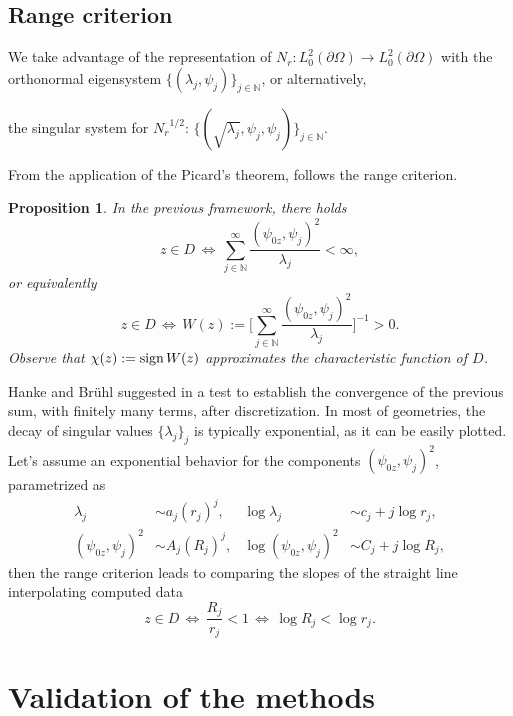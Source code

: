 \documentclass[10pt, a4paper, twoside, openright]{book}
\theoremstyle{definition}
\theoremstyle{plain}
\theoremstyle{plain}
\theoremstyle{plain}
\newtheorem{proposition}[subsection]{Proposition}
\theoremstyle{plain}
\theoremstyle{plain}
\theoremstyle{plain}
\theoremstyle{plain}
\theoremstyle{plain}
\begin{document}
\section{Range criterion}
\label{section:range-criterion}
We take advantage of the representation of ${N_r}:L^2_0(\partial \Omega)\to L^2_0(\partial \Omega)$ with the orthonormal eigensystem $\bigl\{(\lambda_j, \psi_j)\bigr\}_{j\in\mathbb{N}}$, or alternatively,
\begin{center}
the singular system for ${N_r}^{1/2}$: $\bigl\{(\sqrt{\lambda_j}, \psi_j, \psi_j)\bigr\}_{j\in\mathbb{N}}$.
\end{center}
From the application of the Picard's theorem, follows the range criterion.
\begin{proposition}
 In the previous framework, there holds
 \begin{equation}
  z \in D \, \Longleftrightarrow \, \sum_{j \in \mathbb{N}}^{\infty}\frac{(\psi_{0z}, \psi_j)^2}{\lambda_j} < \infty,
 \end{equation}
 or equivalently
 \begin{equation}
  z \in D \, \Longleftrightarrow \, W(z):=\Bigg[\sum_{j \in \mathbb{N}}^{\infty}\frac{(\psi_{0z}, \psi_j)^2}{\lambda_j}\Bigg]^{-1} > 0.
 \end{equation}
Observe that $\chi(z):=\textup{sign}\,W(z)$ approximates the characteristic function of $D$.
\end{proposition}
Hanke and Br\"{u}hl suggested in \cite{hanke-bruhl:recent} a test to establish the convergence of the previous sum, with finitely many terms, after discretization. In most of geometries, the decay of singular values $\bigl\{\lambda_j\bigr\}_j$ is typically exponential, as it can be easily plotted. 
Let's assume an exponential behavior for the components $(\psi_{0z},\psi_j )^2$, parametrized as
\begin{align}
 \lambda_j &\sim a_j (r_j) ^j,  & \log\lambda_j &\sim c_j + j\log r_j,\\
 (\psi_{0z}, \psi_j)^2 &\sim A_j(R_j)^j, & \log(\psi_{0z}, \psi_j)^2 &\sim C_j + j\log R_j,
\end{align}
then the range criterion leads to comparing the slopes of the straight line interpolating computed data
\begin{equation}
 z\in D \,\Longleftrightarrow\, \dfrac{R_j}{r_j} < 1 \,\Longleftrightarrow\, \log R_j < \log r_j.
\end{equation}

\chapter{Validation of the methods}
\label{ch:link}
\end{document}
